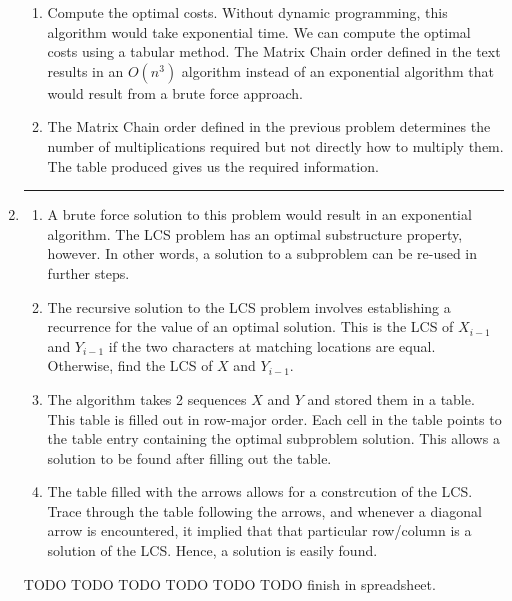 \documentclass{article}
\begin{document}
\begin{enumerate}
\begin{enumerate}
        \item Compute the optimal costs. Without dynamic programming, this algorithm would take exponential time. We can compute the optimal costs using a tabular method. 
            The Matrix Chain order defined in the text results in an $O(n^3)$ algorithm instead of an exponential algorithm that would result from a brute force approach. 

        \item The Matrix Chain order defined in the previous problem determines the number of multiplications required but not directly how to multiply them.  The table produced gives us the required information. 
    \end{enumerate}
\noindent\rule{8cm}{0.4pt}


\item  
    
    \begin{enumerate}
        \item A brute force solution to this problem would result in an exponential algorithm. The LCS problem has an optimal substructure property, however. In other words, a solution to a subproblem can be re-used in further steps. 
            

        \item The recursive solution to the LCS problem involves establishing a recurrence for the value of an optimal solution. This is the LCS of $X_{i-1}$ and $Y_{i-1}$ if the two characters at matching locations are equal. Otherwise, find the LCS of $X$ and $Y_{i-1}$. 

        \item The algorithm takes 2 sequences $X$ and $Y$ and stored them in a table. This table is filled out in row-major order. Each cell in the table points to the table entry containing the optimal subproblem solution. This allows a solution to be found after filling out the table.
            

        \item  The table filled with the arrows allows for a constrcution of the LCS. Trace through the table following the arrows, and whenever a diagonal arrow is encountered, it implied that that particular row/column is a solution of the LCS. Hence, a solution is easily found. 
            
    \end{enumerate}

    TODO TODO TODO TODO TODO 
    TODO finish in spreadsheet.


\end{enumerate}
\end{document}
